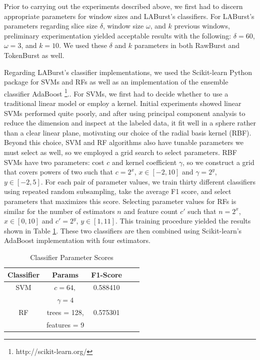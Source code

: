 \documentclass[letterpaper]{article}
\begin{document}
Prior to carrying out the experiments described above, we first had to discern appropriate parameters for window sizes and LABurst's classifiers.
For LABurst's parameters regarding slice size $\delta$, window size $\omega$, and $k$ previous windows, preliminary experimentation yielded acceptable results with the following: $\delta = 60$, $\omega = 3$, and $k=10$.
We used these $\delta$ and $k$ parameters in both RawBurst and TokenBurst as well.

Regarding LABurst's classifier implementations, we used the Scikit-learn Python package for SVMs and RFs as well as an implementation of the ensemble classifier AdaBoost  \footnote{http://scikit-learn.org/}..
For SVMs, we first had to decide whether to use a traditional linear model or employ a kernel.
Initial experiments showed linear SVMs performed quite poorly, and after using principal component analysis to reduce the dimension and inspect at the labeled data, it fit well in a sphere rather than a clear linear plane, motivating our choice of the radial basis kernel (RBF). 
Beyond this choice, SVM and RF algorithms also have tunable parameters we must select as well, so we employed a grid search to select parameters.
RBF SVMs have two parameters: cost $c$ and kernel coefficient $\gamma$, so we construct a grid that covers powers of two such that $c = 2^x$, $x \in [-2, 10]$ and $\gamma = 2^y$, $y \in [-2, 5]$.
For each pair of parameter values, we train thirty different classifiers using repeated random subsampling, take the average F1 score, and select parameters that maximizes this score.
Selecting parameter values for RFs is similar for the number of estimators $n$ and feature count $c'$ such that $n = 2^x$, $x \in [0, 10]$ and $c' = 2^y$, $y \in [1, 11]$.
This training procedure yielded the results shown in Table \ref{tab:scores}.
These two classifiers are then combined using Scikit-learn's AdaBoost implementation with four estimators.

\begin{table}[htdp]
\footnotesize
\caption{Classifier Parameter Scores}
\begin{center}
\begin{tabular}{|c|c|c|c|c|}
\hline
\textbf{Classifier} & \textbf{Params} & \textbf{F1-Score} \\ \hline
SVM & $c=64,$ & 0.588410 \\ 
& $\gamma=4$ & \\ \hline
RF & trees = 128, & 0.575301 \\
& features = 9 &  \\ \hline
\end{tabular}
\end{center}
\label{tab:scores}
\end{table}
\end{document}
